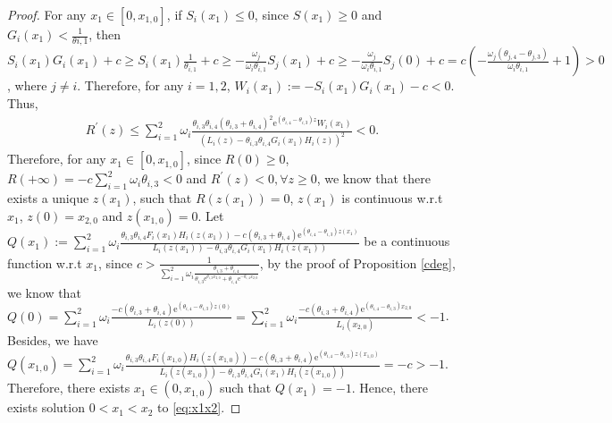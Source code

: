 \documentclass[11pt,reqno]{article}%
\numberwithin{equation}{section}
\begin{document}
\begin{proof}
For any $x_1\in[0,x_{1,0}]$, if $S_i(x_1)\le 0$, since $S(x_1)\ge0$ and $G_i(x_1)<\frac{1}{\theta{i,1}}$, then $S_i(x_1)G_i(x_1)+c\ge S_i(x_1)\frac{1}{\theta_{i,1}}+c\ge -\frac{\omega_j}{\omega_i\theta_{i,1}}S_j(x_1)+c\ge -\frac{\omega_j}{\omega_i\theta_{i,1}}S_j(0)+c=c\left(-\frac{\omega_j(\theta_{j,4}-\theta_{j,3})}{\omega_i\theta_{i,1}}+1\right)>0$, where $j\neq i$. Therefore, for any $i=1,2$, $W_i(x_1):=-S_i(x_1)G_i(x_1)-c<0$. Thus, 
 \begin{equation}\begin{aligned}\nonumber
R^{\prime}(z)\le\sum\limits_{i=1}^{2}\omega_i\frac{\theta_{i,3}\theta_{i,4}(\theta_{i,3}+\theta_{i,4})^2\mathrm{e}^{(\theta_{i,4}-\theta_{i,3})z}W_i(x_1)}{\left(L_i(z)-\theta_{i,3}\theta_{i,4}G_i(x_1)H_i(z)\right)^2}<0.
\end{aligned}\end{equation}
Therefore, for any $x_1\in[0,x_{1,0}]$, since $R(0)\ge0$, $R(+\infty)=-c\sum\limits_{i=1}^{2}\omega_i\theta_{i,3}<0$ and $R^{\prime}(z)<0, \forall z\ge0$, we know that there exists a unique $z(x_1)$, such that $R(z(x_1))=0$, $z(x_1)$ is continuous w.r.t $x_1$, $z(0)=x_{2,0}$ and $z(x_{1,0})=0$. Let $Q(x_1):=\sum\limits_{i=1}^{2}\omega_i\frac{\theta_{i,3}\theta_{i,4}F_i(x_1)H_i(z(x_1))-c(\theta_{i,3}+\theta_{i,4})\mathrm{e}^{(\theta_{i,4}-\theta_{i,3})z(x_1)}}{L_i(z(x_1))-\theta_{i,3}\theta_{i,4}G_i(x_1)H_i(z(x_1))}$ be a continuous function w.r.t $x_1$, since $c>\frac{1}{\sum\limits_{i=1}^{2}\omega_i\frac{\theta_{i,3}+\theta_{i,4}}{\theta_{i,3} \mathrm{e}^{\theta_{i,3}x_{2,0}}+\theta_{i,4}\mathrm{e}^{-\theta_{i,4}x_{2,0}}}}$, by the proof of Proposition \ref{cdeg}, we know that $Q(0)=\sum\limits_{i=1}^{2}\omega_i\frac{-c(\theta_{i,3}+\theta_{i,4})\mathrm{e}^{(\theta_{i,4}-\theta_{i,3})z(0)}}{L_i(z(0))}=\sum\limits_{i=1}^{2}\omega_i\frac{-c(\theta_{i,3}+\theta_{i,4})\mathrm{e}^{(\theta_{i,4}-\theta_{i,3})x_{2,0}}}{L_i(x_{2,0})}<-1$. Besides, we have $Q(x_{1,0})=\sum\limits_{i=1}^{2}\omega_i\frac{\theta_{i,3}\theta_{i,4}F_i(x_{1,0})H_i(z(x_{1,0}))-c(\theta_{i,3}+\theta_{i,4})\mathrm{e}^{(\theta_{i,4}-\theta_{i,3})z(x_{1,0})}}{L_i(z(x_{1,0}))-\theta_{i,3}\theta_{i,4}G_i(x_1)H_i(z(x_{1,0}))}=-c>-1$. Therefore, there exists $x_	1\in(0,x_{1,0})$ such that $Q(x_1)=-1$. Hence, there exists solution $0<x_1<x_2$ to  \eqref{eq:x1x2}.
\end{proof}
\end{document}
